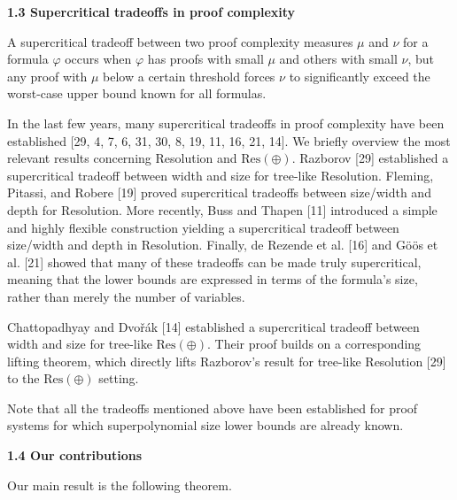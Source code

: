 \par\medskip\noindent\textbf{
1.3 Supercritical tradeoffs in proof complexity}\par


A supercritical tradeoff between two proof complexity measures $\mu$ and $\nu$ for a formula
$\varphi$ occurs when $\varphi$ has proofs with small $\mu$ and others with small $\nu$,
but any proof with $\mu$ below a certain threshold forces $\nu$ to significantly exceed
the worst-case upper bound known for all formulas.\par



In the last few years, many supercritical tradeoffs in proof complexity have been established
[29, 4, 7, 6, 31, 30, 8, 19, 11, 16, 21, 14].
We briefly overview the most relevant results concerning Resolution and $\mathrm{Res}(\oplus)$.
Razborov [29] established a supercritical tradeoff between width and size for tree-like Resolution.
Fleming, Pitassi, and Robere [19] proved supercritical
tradeoffs between size/width and depth for Resolution.
More recently, Buss and Thapen [11] introduced a simple and highly flexible construction
yielding a supercritical tradeoff between size/width and depth in Resolution.
Finally, de Rezende et al. [16] and Göös et al. [21] showed that many of
these tradeoffs can be made truly supercritical, meaning that the lower bounds are expressed in
terms of the formula’s size, rather than merely the number of variables.\par



Chattopadhyay and Dvořák [14] established a supercritical tradeoff between width and
size for tree-like $\mathrm{Res}(\oplus)$.
Their proof builds on a corresponding lifting theorem, which directly lifts Razborov’s result for
tree-like Resolution [29] to the $\mathrm{Res}(\oplus)$ setting.\par



Note that all the tradeoffs mentioned above have been established for proof systems for which
superpolynomial size lower bounds are already known.\par


\par\medskip\noindent\textbf{
1.4 Our contributions}\par


Our main result is the following theorem.\par



